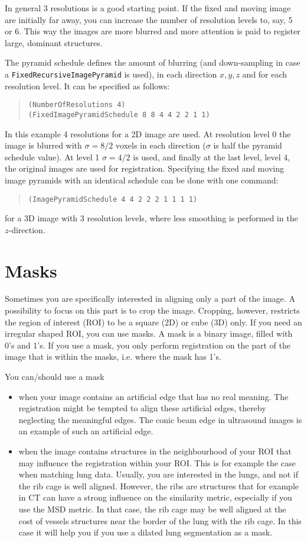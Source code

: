 \documentclass[]{report}
\begin{document}
In general 3 resolutions is a good starting point. If the fixed and
moving image are initially far away, you can increase the number of
resolution levels to, say, 5 or 6. This way the images are more
blurred and more attention is paid to register large, dominant
structures.

The pyramid schedule defines the amount of blurring (and
down-sampling in case a \texttt{FixedRecursiveImagePyramid} is used),
in each direction $x,y,z$ and for each resolution level. It can be
specified as follows:
\begin{quote}
\texttt{(NumberOfResolutions 4)} \\
\texttt{(FixedImagePyramidSchedule 8 8 4 4 2 2 1 1)}
\end{quote}
In this example 4 resolutions for a 2D image are used. At
resolution level 0 the image is blurred with $\sigma = 8/2$ voxels
in each direction ($\sigma$ is half the pyramid schedule value).
At level 1 $\sigma = 4/2$ is used, and finally at the last level,
level 4, the original images are used for registration. Specifying
the fixed and moving image pyramids with an identical schedule can
be done with one command:
\begin{quote}
\texttt{(ImagePyramidSchedule 4 4 2 2 2 1 1 1 1)}
\end{quote}
for a 3D image with 3 resolution levels, where less smoothing is
performed in the $z$-direction.

\section{Masks}

Sometimes you are specifically interested in aligning only a part of
the image. A possibility to focus on this part is to crop the image.
Cropping, however, restricts the region of interest (ROI) to be a
square (2D) or cube (3D) only. If you need an irregular shaped ROI,
you can use masks. A mask is a binary image, filled with 0's and 1's.
If you use a mask, you only perform registration on the part of the
image that is within the masks, i.e. where the mask has 1's.

You can/should use a mask
\begin{itemize}
\item when your image contains an artificial edge that has no real meaning.
The registration might be tempted to align these artificial edges,
thereby neglecting the meaningful edges. The conic beam edge in
ultrasound images is an example of such an artificial edge.

\item when the image contains structures in the neighbourhood
of your ROI that may influence the registration within your ROI.
This is for example the case when matching lung data. Usually, you
are interested in the lungs, and not if the rib cage is well
aligned. However, the ribs are structures that for example in CT can
have a strong influence on the similarity metric, especially if you
use the MSD metric. In that case, the rib cage may be well aligned
at the cost of vessels structures near the border of the lung with
the rib cage. In this case it will help you if you use a dilated
lung segmentation as a mask.
\end{itemize}
\end{document}
